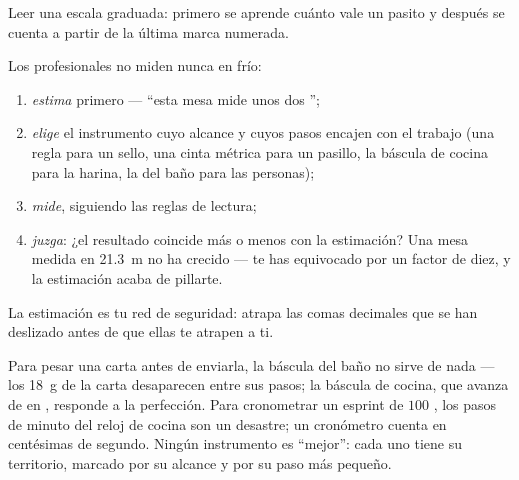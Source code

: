 \begin{omfigure}

{\small Leer una escala graduada: primero se aprende cuánto vale un
pasito y después se cuenta a partir de la última marca numerada.}
\end{omfigure}

\begin{method}\label{met:g6:measurement-in-science:estimate}
Los profesionales no miden nunca en frío:
\begin{enumerate}
  \item \emph{estima} primero --- ``esta mesa mide unos dos
        '';
  \item \emph{elige} el instrumento cuyo alcance y cuyos pasos
        encajen con el trabajo (una regla para un sello, una cinta
        métrica para un pasillo, la báscula de cocina para la harina,
        la del baño para las personas);
  \item \emph{mide}, siguiendo las reglas de lectura;
  \item \emph{juzga}: ¿el resultado coincide más o menos con la
        estimación? Una mesa medida en \qty{21.3}{m} no ha crecido
        --- te has equivocado por un factor de diez, y la estimación
        acaba de pillarte.
\end{enumerate}
La estimación es tu red de seguridad: atrapa las comas decimales que
se han deslizado antes de que ellas te atrapen a ti.
\end{method}

\begin{example}\label{ex:g6:measurement-in-science:choose}
Para pesar una carta antes de enviarla, la báscula del baño no sirve
de nada --- los \qty{18}{g} de la carta desaparecen entre sus pasos;
la báscula de cocina, que avanza de  en , responde a la
perfección. Para cronometrar un esprint de $100$ , los pasos de
minuto del reloj de cocina son un desastre; un cronómetro cuenta en
centésimas de segundo. Ningún instrumento es ``mejor'': cada uno tiene
su territorio, marcado por su alcance y por su paso más pequeño.
\end{example}


